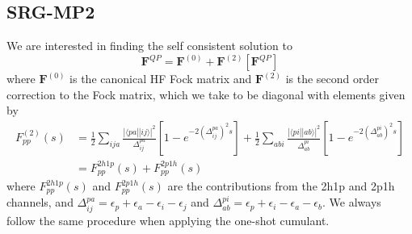 \subsection{SRG-MP2}
We are interested in finding the self consistent solution to
\begin{equation}
    \bm{F}^{QP}= \bm{F}^{(0)} + \bm{F}^{(2)}[\bm{F}^{QP}]
\end{equation}
where $\bm{F}^{(0)}$ is the canonical HF Fock matrix and $\bm{F}^{(2)}$ is the second order correction to the Fock matrix, which we take to be diagonal with elements given by
\begin{align}
F_{p p}^{(2)}(s) & =\frac{1}{2} \sum_{i j a} \frac{|\langle p a||i j\rangle|^2}{\Delta_{i j}^{p a}}\left[1-e^{-2\left(\Delta_{i j}^{p a}\right)^2 s}\right] +\frac{1}{2} \sum_{a b i} \frac{|\langle p i||a b\rangle|^2}{\Delta_{a b}^{p i}}\left[1-e^{-2\left(\Delta_{a b}^{p i}\right)^2 s}\right] \\
&= F_{pp}^{2h1p}(s) + F_{pp}^{2p1h}(s)
\end{align}
where $F_{pp}^{2h1p}(s)$ and $F_{pp}^{2p1h}(s)$ are the contributions from the 2h1p and 2p1h channels, and
 $\Delta_{i j}^{p a} = \epsilon_p + \epsilon_a - \epsilon_i - \epsilon_j$ and $\Delta_{a b}^{p i} = \epsilon_p + \epsilon_i - \epsilon_a - \epsilon_b$.
We always follow the same procedure when applying the one-shot cumulant.
